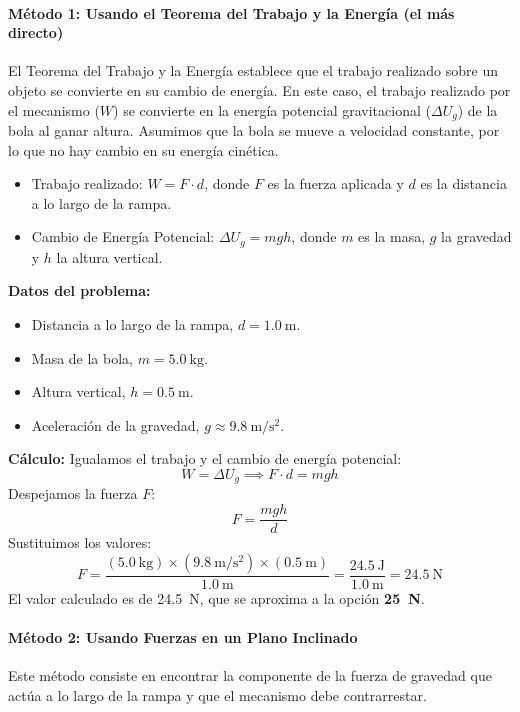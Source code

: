 \documentclass[11pt,a4paper]{book}
\begin{document}
\paragraph{Método 1: Usando el Teorema del Trabajo y la Energía (el más directo)}
El Teorema del Trabajo y la Energía establece que el trabajo realizado sobre un objeto se convierte en su cambio de energía. En este caso, el trabajo realizado por el mecanismo ($W$) se convierte en la energía potencial gravitacional ($\Delta U_g$) de la bola al ganar altura. Asumimos que la bola se mueve a velocidad constante, por lo que no hay cambio en su energía cinética.

\begin{itemize}
    \item Trabajo realizado: $W = F \cdot d$, donde $F$ es la fuerza aplicada y $d$ es la distancia a lo largo de la rampa.
    \item Cambio de Energía Potencial: $\Delta U_g = mgh$, donde $m$ es la masa, $g$ la gravedad y $h$ la altura vertical.
\end{itemize}
\textbf{Datos del problema:}
\begin{itemize}
    \item Distancia a lo largo de la rampa, $d = \SI{1.0}{\meter}$.
    \item Masa de la bola, $m = \SI{5.0}{\kilo\gram}$.
    \item Altura vertical, $h = \SI{0.5}{\meter}$.
    \item Aceleración de la gravedad, $g \approx \SI{9.8}{\meter\per\second\squared}$.
\end{itemize}
\textbf{Cálculo:}
Igualamos el trabajo y el cambio de energía potencial:
\[ W = \Delta U_g \implies F \cdot d = mgh \]
Despejamos la fuerza $F$:
\[ F = \frac{mgh}{d} \]
Sustituimos los valores:
\[ F = \frac{(\SI{5.0}{\kilo\gram}) \times (\SI{9.8}{\meter\per\second\squared}) \times (\SI{0.5}{\meter})}{\SI{1.0}{\meter}} = \frac{\SI{24.5}{\joule}}{\SI{1.0}{\meter}} = \SI{24.5}{\newton} \]
El valor calculado es de \SI{24.5}{\newton}, que se aproxima a la opción \textbf{\SI{25}{\newton}}.

\paragraph{Método 2: Usando Fuerzas en un Plano Inclinado}
Este método consiste en encontrar la componente de la fuerza de gravedad que actúa a lo largo de la rampa y que el mecanismo debe contrarrestar.
\end{document}

